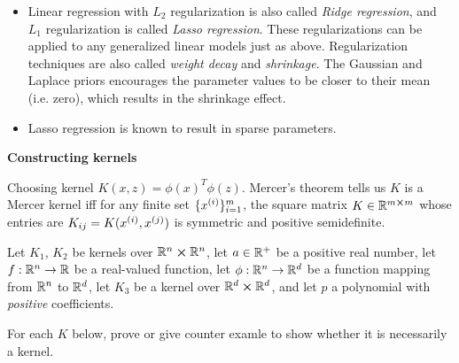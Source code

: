 \documentclass[12pt,letterpaper,boxed]{hmcpset}
\begin{document}
\begin{remark}
  \begin{itemize}
    \item Linear regression with $L_2$ regularization is also called \emph{Ridge regression}, and $L_1$ regularization is called \emph{Lasso regression}. These regularizations can be applied to any generalized linear models just as above. Regularization techniques are also called \emph{weight decay} and \emph{shrinkage}. The Gaussian and Laplace priors encourages the parameter values to be closer to their mean (i.e. zero), which results in the shrinkage effect.
    
    \item Lasso regression is known to result in sparse parameters.
  \end{itemize}
\end{remark}

\begin{problem}[Problem 4]
  \textbf{Constructing kernels}

  Choosing kernel $K(x,z) = \phi(x)^T \phi(z)$. Mercer's theorem tells us $K$ is a Mercer kernel iff for any finite set $\{\xx\}_{i=1}^m$, the square matrix $K \in \mathbb{R}^{m \cross m}$ whose entries are $K_{ij} = K(\xx, x^{(j)})$ is symmetric and positive semidefinite.

  Let $K_1$, $K_2$ be kernels over $\mathbb{R}^n \cross \mathbb{R}^n$, let $a \in \mathbb{R}^+$ be a positive real number, let $f: \mathbb{R}^n \to \mathbb{R}$ be a real-valued function, let $\phi: \mathbb{R}^n \to \mathbb{R}^d$ be a function mapping from $\mathbb{R}^n$ to $\mathbb{R}^d$, let $K_3$ be a kernel over $\mathbb{R}^d \cross \mathbb{R}^d$, and let $p$ a polynomial with \emph{positive} coefficients.

  For each $K$ below, prove or give counter examle to show whether it is necessarily a kernel.
\end{problem}
\end{document}
